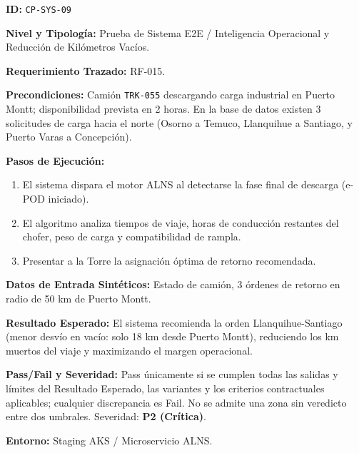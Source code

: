 \par\noindent\textbf{ID:} \texttt{C\allowbreak{}P\allowbreak{}-\allowbreak{}S\allowbreak{}Y\allowbreak{}S\allowbreak{}-\allowbreak{}0\allowbreak{}9\allowbreak{}}\par
\par\noindent\textbf{Nivel y Tipología:} Prueba de Sistema E2E / Inteligencia Operacional y Reducción de Kilómetros Vacíos.\par
\par\noindent\textbf{Requerimiento Trazado:} RF-015.\par
\par\noindent\textbf{Precondiciones:} Camión \texttt{T\allowbreak{}R\allowbreak{}K\allowbreak{}-\allowbreak{}0\allowbreak{}5\allowbreak{}5\allowbreak{}} descargando carga industrial en Puerto Montt; disponibilidad prevista en 2 horas. En la base de datos existen 3 solicitudes de carga hacia el norte (Osorno a Temuco, Llanquihue a Santiago, y Puerto Varas a Concepción).\par
\par\noindent\textbf{Pasos de Ejecución:} \par
\begin{enumerate}
\item El sistema dispara el motor ALNS al detectarse la fase final de descarga (e-POD iniciado).
\item El algoritmo analiza tiempos de viaje, horas de conducción restantes del chofer, peso de carga y compatibilidad de rampla.
\item Presentar a la Torre la asignación óptima de retorno recomendada.
\end{enumerate}
\par\noindent\textbf{Datos de Entrada Sintéticos:} Estado de camión, 3 órdenes de retorno en radio de 50 km de Puerto Montt.\par
\par\noindent\textbf{Resultado Esperado:} El sistema recomienda la orden Llanquihue-Santiago (menor desvío en vacío: solo 18 km desde Puerto Montt), reduciendo los km muertos del viaje y maximizando el margen operacional.\par
\par\noindent\textbf{Pass/Fail y Severidad:} Pass únicamente si se cumplen todas las salidas y límites del Resultado Esperado, las variantes y los criterios contractuales aplicables; cualquier discrepancia es Fail. No se admite una zona sin veredicto entre dos umbrales. Severidad: \textbf{P2 (Crítica)}.\par
\par\noindent\textbf{Entorno:} Staging AKS / Microservicio ALNS.\par







